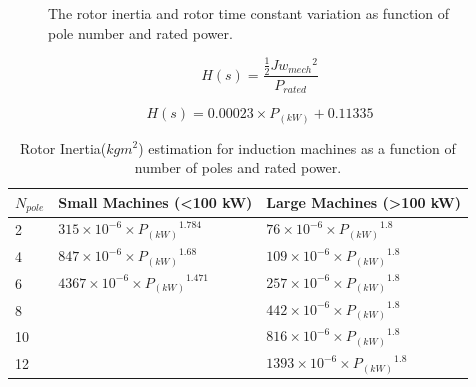 \documentclass[twocolumn]{article}
\begin{document}
\begin{figure}[]
  \centering

    \caption{The rotor inertia and rotor time constant variation as function of pole number and rated power.} 
    \label{inertia_timeconstant}
\end{figure}


\begin{equation}
	H(s)=\frac{\frac{1}{2} J {w_{mech}}^2}{P_{rated}}
	\label{eq:time_constant}
\end{equation}

\begin{equation}
	H(s)=0.00023 \times P_{(kW)} + 0.11335
	\label{eq:time_constant_trend}
\end{equation}

\begin{table}
  \centering
  \begin{tabular}{lll}
   $N_{pole}$ & Small Machines (<100 kW) & Large Machines (>100 kW) \\
  \hline
2 & $315\times10^{-6}\times {P_{(kW)}}^{1.784}$ & $76\times10^{-6}\times {P_{(kW)}}^{1.8}$ \\
4 & $847\times10^{-6}\times {P_{(kW)}}^{1.68}$ & $109\times10^{-6}\times {P_{(kW)}}^{1.8}$ \\
6 & $4367\times10^{-6}\times {P_{(kW)}}^{1.471}$ & $257\times10^{-6}\times {P_{(kW)}}^{1.8}$ \\
8 &  & $442\times10^{-6}\times {P_{(kW)}}^{1.8}$ \\
10 & & $816\times10^{-6}\times {P_{(kW)}}^{1.8}$ \\
12 & & $1393\times10^{-6}\times {P_{(kW)}}^{1.8}$ \\
\hline
  \end{tabular}
  \caption{Rotor Inertia($kg m^2$) estimation for induction machines as a function of number of poles and rated power.}
  \label{inertia_estimation}
\end{table}
\end{document}
